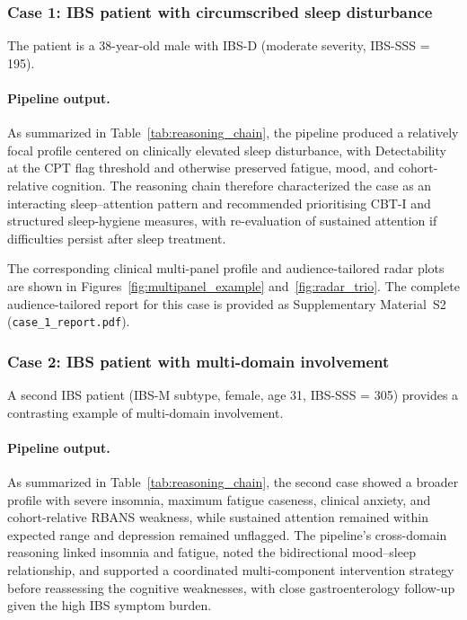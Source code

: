 \documentclass[11pt,a4paper]{article}
\begin{document}
\subsubsection{Case 1: IBS patient with circumscribed sleep disturbance}

The patient is a 38-year-old male with IBS-D (moderate severity, IBS-SSS = 195).

\paragraph{Pipeline output.}
As summarized in Table~\ref{tab:reasoning_chain}, the pipeline produced a relatively focal profile centered on clinically elevated sleep disturbance, with Detectability at the CPT flag threshold and otherwise preserved fatigue, mood, and cohort-relative cognition. The reasoning chain therefore characterized the case as an interacting sleep--attention pattern and recommended prioritising CBT-I and structured sleep-hygiene measures, with re-evaluation of sustained attention if difficulties persist after sleep treatment.

The corresponding clinical multi-panel profile and audience-tailored radar plots are shown in Figures~\ref{fig:multipanel_example} and~\ref{fig:radar_trio}. The complete audience-tailored report for this case is provided as Supplementary Material~S2 (\texttt{case\_1\_report.pdf}).




\subsubsection{Case 2: IBS patient with multi-domain involvement}

A second IBS patient (IBS-M subtype, female, age 31, IBS-SSS = 305) provides a contrasting example of multi-domain involvement.

\paragraph{Pipeline output.}
As summarized in Table~\ref{tab:reasoning_chain}, the second case showed a broader profile with severe insomnia, maximum fatigue caseness, clinical anxiety, and cohort-relative RBANS weakness, while sustained attention remained within expected range and depression remained unflagged. The pipeline's cross-domain reasoning linked insomnia and fatigue, noted the bidirectional mood--sleep relationship, and supported a coordinated multi-component intervention strategy before reassessing the cognitive weaknesses, with close gastroenterology follow-up given the high IBS symptom burden.
\end{document}
